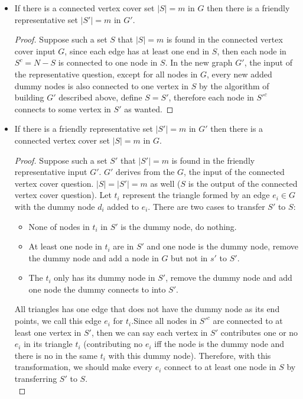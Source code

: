 \documentclass[10pt]{article}
\begin{document}
\begin{mdframed}
        \begin{itemize}
            \item If there is a connected vertex cover set $|S| = m$ in $G$ then there is a friendly representative set $|S'| = m$ in $G'$.
            \begin{proof}
            Suppose such a set $S$ that $|S| = m$ is found in the connected vertex cover input $G$, since each edge has at least one end in $S$, then each node in $S^c = N - S$ is connected to one node in $S$. In the new graph $G'$, the input of the representative question, except for all nodes in $G$, every new added dummy nodes is also connected to one vertex in $S$ by the algorithm of building $G'$ described above, define $S = S'$, therefore each node in $S'^c$ connects to some vertex in $S'$ as wanted.
            \end{proof}
            \item If there is a friendly representative set $|S'| = m$ in $G'$ then there is a connected vertex cover set $|S| = m$ in $G$.
            \begin{proof}
            Suppose such a set $S'$ that $|S'| = m$ is found in the friendly representative input $G'$. $G'$ derives from the $G$, the input of the connected vertex cover question. $|S| = |S'| = m$ as well ($S$ is the output of the connected vertex cover question). Let $t_i$ represent the triangle formed by an edge $e_i \in G$  with the dummy node $d_i$ added to $e_i$. There are two cases to transfer $S'$ to $S$:
            \begin{itemize}
                \item None of nodes in $t_i$ in $S'$ is the dummy node, do nothing.
                \item At least one node in $t_i$ are in $S'$ and one node is the dummy node, remove the dummy node and add a node in $G$ but not in $s'$ to $S'$.
                \item The $t_i$ only has its dummy node in $S'$, remove the dummy node and add one node the dummy connects to into $S'$.
            \end{itemize}
            All triangles has one edge that does not have the dummy node as its end points, we call this edge $e_i$ for $t_i$.Since all nodes in $S'^c$ are connected to at least one vertex in $S'$, then we can say each vertex in $S'$ contributes one or no $e_i$ in its triangle $t_i$ (contributing no $e_i$ iff the node is the dummy node and there is no in the same $t_i$ with this dummy node). Therefore, with this transformation, we should make every  $e_i$ connect to at least one node in $S$ by transferring $S'$ to $S$.\\

\end{proof}
\end{itemize}
\end{mdframed}
\end{document}
